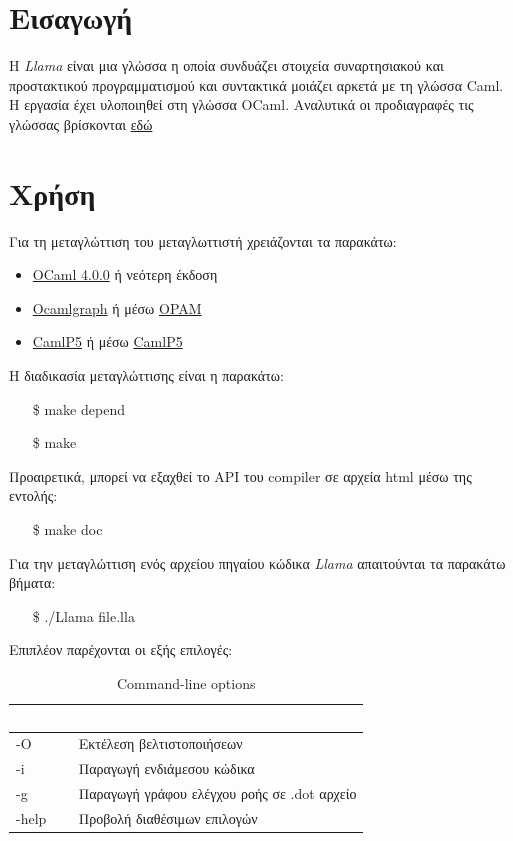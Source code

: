 \documentclass[12pt]{article}
\newcommand{\Llama}{\textit{Llama }}
\begin{document}
\section{Εισαγωγή}
H \Llama είναι μια γλώσσα η οποία συνδυάζει στοιχεία συναρτησιακού και προστακτικού προγραμματισμού και συντακτικά μοιάζει αρκετά με τη γλώσσα Caml. Η εργασία έχει υλοποιηθεί στη γλώσσα OCaml. Αναλυτικά οι προδιαγραφές τις γλώσσας βρίσκονται \href{http://courses.softlab.ntua.gr/compilers/2012a/llama2012.pdf}{εδώ}
\section{Χρήση}
Για τη μεταγλώττιση του μεταγλωττιστή χρειάζονται τα παρακάτω:
\begin{itemize}
\item \href{http://ocaml.org/install.html}{OCaml 4.0.0} ή νεότερη έκδοση
\item \href{http://ocamlgraph.lri.fr}{Ocamlgraph} ή μέσω \href{http://opam.ocaml.org/pkg/ocamlgraph/}{OPAM}
\item \href{http://pauillac.inria.fr/~ddr/camlp5/}{CamlP5} ή μέσω \href{http://opam.ocaml.org/pkg/camlp5}{CamlP5}
\end{itemize}

Η διαδικασία μεταγλώττισης είναι η παρακάτω:
\begin{itemize}
\item[\$] make depend
\item[\$] make
\end{itemize}
Προαιρετικά, μπορεί να εξαχθεί το API του compiler σε αρχεία html μέσω της εντολής:
\begin{itemize}
\item[\$] make doc
\end{itemize}
Για την μεταγλώττιση ενός αρχείου πηγαίου κώδικα \Llama απαιτούνται τα παρακάτω βήματα:
\begin{itemize}
\item[\$] ./Llama file.lla
\end{itemize}
Επιπλέον παρέχονται οι εξής επιλογές:

\begin{table}[htbp]
\centering
\begin{tabular}{|l|l|}
\hline
   \rowcolor{ablack}
    \textcolor{white}{Option} & \textcolor{white}{Description} \\ \hline
    
    \rowcolor{gray}
    -O & Εκτέλεση βελτιστοποιήσεων \\ 
    
    -i & Παραγωγή ενδιάμεσου κώδικα \\ 
    
     \rowcolor{gray}
    -g & Παραγωγή γράφου ελέγχου ροής σε .dot αρχείο \\
    
    -help & Προβολή διαθέσιμων επιλογών \\ 
    
\hline
\end{tabular}
\caption{Command-line options}
\end{table}
\end{document}
